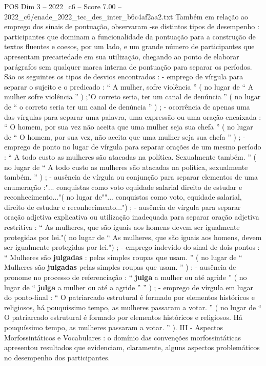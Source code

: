 \begin{textsample}{POS Dim 3 – 2022\_c6 – Score 7.00 – 2022\_c6/enade\_2022\_tec\_des\_inter\_b6c4af2aa2.txt}
Também em relação ao emprego dos sinais de pontuação, observaram -se distintos tipos de desempenho : participantes que dominam a funcionalidade da pontuação para a construção de textos fluentes e coesos, por um lado, e um grande número de participantes que apresentam precariedade em sua utilização, chegando ao ponto de elaborar parágrafos sem qualquer marca interna de pontuação para separar os períodos.
São os seguintes os tipos de desvios encontrados : - emprego de vírgula para separar o sujeito e o predicado : “ A mulher, sofre violência ” ( no lugar de “ A mulher sofre violência ” ) ;"O correto seria, ter um canal de denúncia ” ( no lugar de “ o correto seria ter um canal de denúncia ” ) ; - ocorrência de apenas uma das vírgulas para separar uma palavra, uma expressão ou uma oração encaixada : “ O homem, por sua vez não aceita que uma mulher seja sua chefa ” ( no lugar de “ O homem, por sua vez, não aceita que uma mulher seja sua chefa ” ) ; - emprego de ponto no lugar de vírgula para separar orações de um mesmo período : “ A todo custo as mulheres são atacadas na política.
Sexualmente também. ” ( no lugar de “ A todo custo as mulheres são atacadas na política, sexualmente também. ” ) ; - ausência de vírgula ou conjunção para separar elementos de uma enumeração :"... conquistas como voto equidade salarial direito de estudar e reconhecimento..."( no lugar de""... conquistas como voto, equidade salarial, direito de estudar e reconhecimento...") ; - ausência de vírgula para separar oração adjetiva explicativa ou utilização inadequada para separar oração adjetiva restritiva : “ As mulheres, que são iguais aos homens devem ser igualmente protegidas por lei."( no lugar de “ As mulheres, que são iguais aos homens, devem ser igualmente protegidas por lei.") ; - emprego indevido do sinal de dois pontos : “ Mulheres são \textbf{julgadas} : pelas simples roupas que usam. ” ( no lugar de “ Mulheres são \textbf{julgadas} pelas simples roupas que usam. ” ) ; - ausência de pronome no processo de referenciação : “ \textbf{julga} a mulher ou até agride ” ( no lugar de “ \textbf{julga} a mulher ou até a agride ” ” ) ; - emprego de vírgula em lugar do ponto-final : “ O patriarcado estrutural é formado por elementos históricos e religiosos, há pouquíssimo tempo, as mulheres passaram a votar. ” ( no lugar de “ O patriarcado estrutural é formado por elementos históricos e religiosos.
Há pouquíssimo tempo, as mulheres passaram a votar. ” ).
III - Aspectos Morfossintáticos e Vocabulares : o domínio das convenções morfossintáticas apresentou resultados que evidenciam, claramente, alguns aspectos problemáticos no desempenho dos participantes.

\end{textsample}
